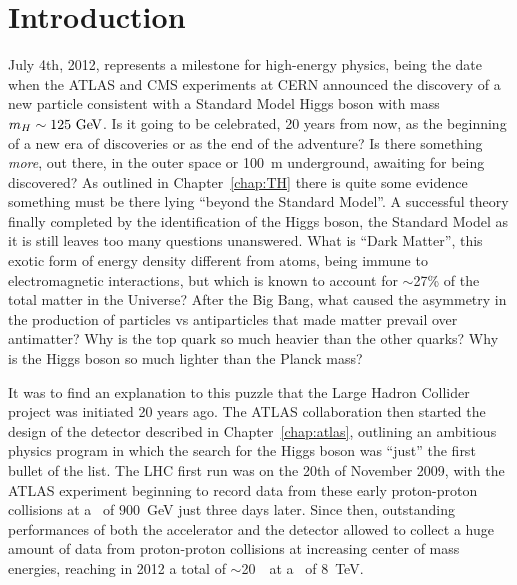 \clearpage{\pagestyle{empty}\cleardoublepage}

\chapter*{Introduction}\label{chap:intro}

\vskip-1.5cm

July 4th, 2012, represents a milestone for high-energy physics,
being the date when the ATLAS and CMS experiments at CERN announced
the discovery of a new particle consistent with a Standard Model Higgs
boson with mass $m_H\sim 125\gev$. Is it going to be celebrated, 20 years
from now, as the beginning of a new era of discoveries or as the 
end of the adventure? Is there something {\it more}, out there, in 
the outer space or 100~m underground, awaiting for being discovered?
As outlined in Chapter~\ref{chap:TH} there is quite some evidence
something must be there lying ``beyond the Standard Model''. 
A successful theory finally completed
by the identification of the Higgs boson, 
the Standard Model as it is still leaves too many questions
unanswered. What is ``Dark Matter'', this exotic form of energy density different
from atoms, being immune to electromagnetic interactions, but which
is known to account for $\sim$27\% of the total matter in the Universe?
After the Big Bang, what caused the asymmetry in the production of particles vs
antiparticles that made matter prevail over antimatter?
Why is the top quark so much heavier than the other quarks? Why is the
Higgs boson so much lighter than the Planck mass?

It was to find an explanation to this puzzle that the 
Large Hadron Collider project was initiated 20 years ago. The ATLAS
collaboration then started the design of the detector described in
Chapter~\ref{chap:atlas}, outlining an ambitious physics program
in which the search for the Higgs boson was ``just'' the first bullet
of the list.
The LHC first run was on the 20th of November 2009, with the ATLAS
experiment beginning to record data from these early proton-proton
collisions at a \cme\ of $900$~GeV just three days later.
Since then, outstanding performances of both the accelerator
and the detector allowed to collect a huge amount of data
from proton-proton collisions at increasing center of mass energies, reaching in
2012 a total of $\sim$20~\ifb\ at a \cme\ of 8~TeV.

